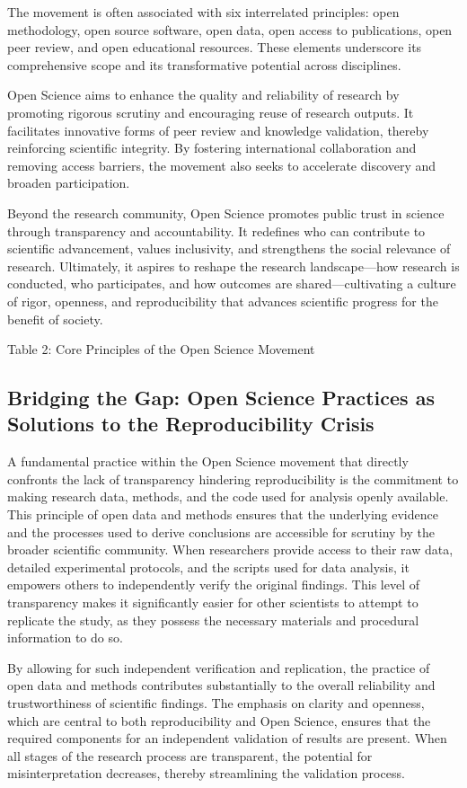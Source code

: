 \documentclass{article}
\begin{document}
The movement is often associated with six interrelated principles: open methodology, open source software, open data, open access to publications, open peer review, and open educational resources. These elements underscore its comprehensive scope and its transformative potential across disciplines.

Open Science aims to enhance the quality and reliability of research by promoting rigorous scrutiny and encouraging reuse of research outputs. It facilitates innovative forms of peer review and knowledge validation, thereby reinforcing scientific integrity. By fostering international collaboration and removing access barriers, the movement also seeks to accelerate discovery and broaden participation.

Beyond the research community, Open Science promotes public trust in science through transparency and accountability. It redefines who can contribute to scientific advancement, values inclusivity, and strengthens the social relevance of research. Ultimately, it aspires to reshape the research landscape—how research is conducted, who participates, and how outcomes are shared—cultivating a culture of rigor, openness, and reproducibility that advances scientific progress for the benefit of society.

Table 2: Core Principles of the Open Science Movement

\subsection{Bridging the Gap: Open Science Practices as Solutions to the Reproducibility Crisis}

A fundamental practice within the Open Science movement that directly confronts the lack of transparency hindering reproducibility is the commitment to making research data, methods, and the code used for analysis openly available. This principle of open data and methods ensures that the underlying evidence and the processes used to derive conclusions are accessible for scrutiny by the broader scientific community. When researchers provide access to their raw data, detailed experimental protocols, and the scripts used for data analysis, it empowers others to independently verify the original findings. This level of transparency makes it significantly easier for other scientists to attempt to replicate the study, as they possess the necessary materials and procedural information to do so.

By allowing for such independent verification and replication, the practice of open data and methods contributes substantially to the overall reliability and trustworthiness of scientific findings. The emphasis on clarity and openness, which are central to both reproducibility and Open Science, ensures that the required components for an independent validation of results are present. When all stages of the research process are transparent, the potential for misinterpretation decreases, thereby streamlining the validation process.
\end{document}
